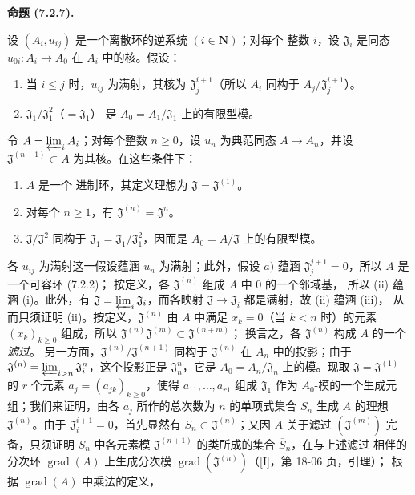 \documentclass[UTF8,fontset=none,11pt,oneside,openany]{ctexbook}
\newenvironment{proposition}[1][]{%
  \par\medskip\noindent\textbf{命题 (#1).}\ %
}{\par}
\let\EGAOriginalLabel\label
\renewcommand{\label}[1]{\phantomsection\EGAOriginalLabel{#1}}
\begin{document}
\begin{proposition}[7.2.7]
\label{0.7.2.7-fr}
设 $(A_i,u_{ij})$ 是一个离散环的逆系统 $(i\in\mathbf N)$；对每个
整数 $i$，设 $\mathfrak J_i$ 是同态
$u_{0i}:A_i\to A_0$ 在 $A_i$ 中的核。假设：
\begin{enumerate}
  \item[$a)$] 当 $i\leq j$ 时，$u_{ij}$ 为满射，其核为
    $\mathfrak J_j^{i+1}$（所以 $A_i$ 同构于
    $A_j/\mathfrak J_j^{i+1}$）。
  \item[$b)$] $\mathfrak J_1/\mathfrak J_1^2$（$=\mathfrak J_1$）
    是 $A_0=A_1/\mathfrak J_1$ 上的有限型模。
\end{enumerate}
令 $A=\varprojlim_i A_i$；对每个整数 $n\geq0$，设 $u_n$ 为典范同态
$A\to A_n$，并设 $\mathfrak J^{(n+1)}\subset A$ 为其核。在这些条件下：
\begin{enumerate}
  \item[(i)] $A$ 是一个 进制环，其定义理想为
    $\mathfrak J=\mathfrak J^{(1)}$。
  \item[(ii)] 对每个 $n\geq1$，有
    $\mathfrak J^{(n)}=\mathfrak J^n$。
  \item[(iii)] $\mathfrak J/\mathfrak J^2$ 同构于
    $\mathfrak J_1=\mathfrak J_1/\mathfrak J_1^2$，因而是
    $A_0=A/\mathfrak J$ 上的有限型模。
\end{enumerate}
\end{proposition}

各 $u_{ij}$ 为满射这一假设蕴涵 $u_n$ 为满射；此外，假设 $a)$
蕴涵 $\mathfrak J_j^{j+1}=0$，所以 $A$ 是一个可容环 (7.2.2)；
按定义，各 $\mathfrak J^{(n)}$ 组成 $A$ 中 $0$ 的一个邻域基，
所以 (ii) 蕴涵 (i)。此外，有
$\mathfrak J=\varprojlim_i\mathfrak J_i$，而各映射
$\mathfrak J\to\mathfrak J_i$ 都是满射，故 (ii) 蕴涵 (iii)，
从而只须证明 (ii)。按定义，$\mathfrak J^{(n)}$ 由 $A$ 中满足
$x_k=0$（当 $k<n$ 时）的元素 $(x_k)_{k\geq0}$ 组成，所以
$\mathfrak J^{(n)}\mathfrak J^{(m)}\subset\mathfrak J^{(n+m)}$；
换言之，各 $\mathfrak J^{(n)}$ 构成 $A$ 的一个\emph{滤过}。
另一方面，$\mathfrak J^{(n)}/\mathfrak J^{(n+1)}$ 同构于
$\mathfrak J^{(n)}$ 在 $A_n$ 中的投影；由于
$\mathfrak J^{(n)}=\varprojlim_{i>n}\mathfrak J_i^n$，这个投影正是
$\mathfrak J_n^n$，它是 $A_0=A_n/\mathfrak J_n$ 上的模。现取
$\mathfrak J=\mathfrak J^{(1)}$ 的 $r$ 个元素
$a_j=(a_{jk})_{k\geq0}$，使得 $a_{11},\ldots,a_{r1}$ 组成
$\mathfrak J_1$ 作为 $A_0$-模的一个生成元组；我们来证明，由各
$a_j$ 所作的总次数为 $n$ 的单项式集合 $S_n$ 生成 $A$ 的理想
$\mathfrak J^{(n)}$。由于 $\mathfrak J_i^{i+1}=0$，首先显然有
$S_n\subset\mathfrak J^{(n)}$；又因 $A$ 关于滤过
$(\mathfrak J^{(m)})$ 完备，只须证明 $S_n$ 中各元素模
$\mathfrak J^{(n+1)}$ 的类所成的集合 $\overline S_n$，在与上述滤过
相伴的分次环 $\operatorname{grad}(A)$ 上生成分次模
$\operatorname{grad}(\mathfrak J^{(n)})$（[I]，第 18-06 页，引理）；
根据 $\operatorname{grad}(A)$ 中乘法的定义，
\end{document}
